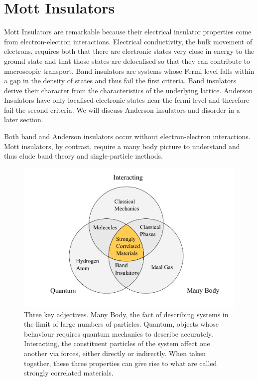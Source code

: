 \hypertarget{mott-insulators}{%
\section{Mott Insulators}\label{mott-insulators}}

Mott Insulators are remarkable because their electrical insulator properties come from electron-electron interactions. Electrical conductivity, the bulk movement of electrons, requires both that there are electronic states very close in energy to the ground state and that those states are delocalised so that they can contribute to macroscopic transport. Band insulators are systems whose Fermi level falls within a gap in the density of states and thus fail the first criteria. Band insulators derive their character from the characteristics of the underlying lattice. Anderson Insulators have only localised electronic states near the fermi level and therefore fail the second criteria. We will discuss Anderson insulators and disorder in a later section.

Both band and Anderson insulators occur without electron-electron interactions. Mott insulators, by contrast, require a many body picture to understand and thus elude band theory and single-particle methods.

\hypertarget{fig:venn_diagram}{%
\begin{figure}
\centering
\includegraphics[width=1\textwidth,height=\textheight]{figure_code/intro_chapter/venn_diagram}
\caption[{Interacting Quantum Many Body Systems Venn Diagram}]{Three key adjectives. Many Body, the fact of describing systems in the limit of large numbers of particles. Quantum, objects whose behaviour requires quantum mechanics to describe accurately. Interacting, the constituent particles of the system affect one another via forces, either directly or indirectly. When taken together, these three properties can give rise to what are called strongly correlated materials.}
\label{fig:venn_diagram}
\end{figure}
}

